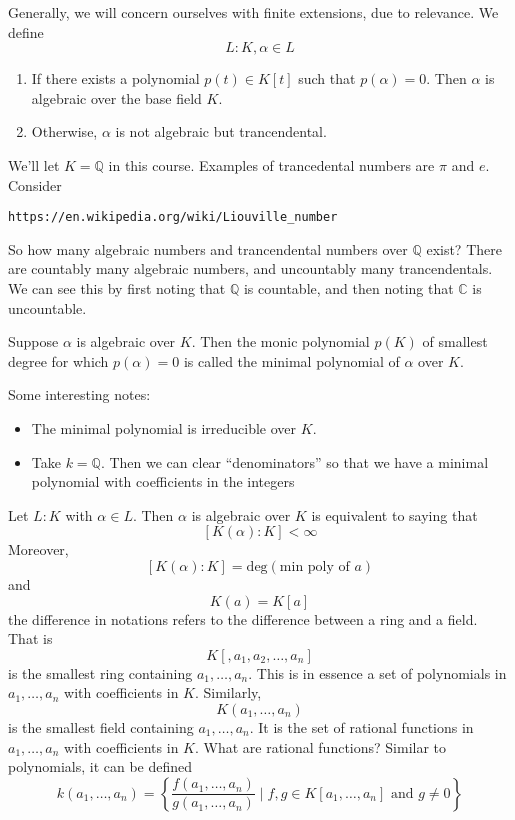 \documentclass{article}
\begin{document}
Generally, we will concern ourselves with finite extensions, due to relevance.
We define 
\[ L : K, \alpha \in L \]
\begin{enumerate}
\item If there exists a polynomial $p(t) \in K[t]$ such that $p(\alpha) = 0$.
Then $\alpha$ is algebraic over the base field $K$. 
\item Otherwise, $\alpha$ is not algebraic but trancendental.
\end{enumerate}
We'll let $K = \mathbb{Q}$ in this course. Examples of trancedental numbers are
$\pi$ and $e$. Consider
\begin{verbatim}https://en.wikipedia.org/wiki/Liouville_number\end{verbatim}
So how many algebraic numbers and trancendental numbers over $\mathbb{Q}$ exist?
There are countably many algebraic numbers, and uncountably many trancendentals.
We can see this by first noting that $\mathbb{Q}$ is countable, and then noting
that $\mathbb{C}$ is uncountable. 

Suppose $\alpha$ is algebraic over $K$. Then the monic polynomial $p(K)$ of smallest
degree for which $p(\alpha) = 0$ is called the minimal polynomial of $\alpha$
over $K$. 

Some interesting notes:
\begin{itemize}
\item The minimal polynomial is irreducible over $K$. 
\item Take $k = \mathbb{Q}$. Then we can clear ``denominators'' so that we have
a minimal polynomial with coefficients in the integers
\end{itemize}

Let $L:K$ with $\alpha \in L$. Then $\alpha$ is algebraic over $K$ is equivalent
to saying that
\[ [ K(\alpha) : K ] < \infty \]
Moreover,
\[ [ K(\alpha) : K ] = \text{deg}(\text{min poly of }a) \]
and 
\[ K(a) = K[a] \]
the difference in notations refers to the difference between a ring and a field.
That is
\[ K[,a_1, a_2, \ldots, a_n] \]
is the smallest ring containing $a_1,\ldots,a_n$. This is in essence a set of
polynomials in $a_1, \ldots, a_n$ with coefficients in $K$. Similarly, 
\[ K(a_1, \ldots, a_n) \]
is the smallest field containing $a_1,\ldots,a_n$. It is the set of rational
functions in $a_1, \ldots, a_n$ with coefficients in $K$. What are rational
functions? Similar to polynomials, it can be defined
\[ k(a_1,\ldots,a_n) = \left\{\frac{f(a_1, \ldots, a_n)}{g(a_1, \ldots,
a_n)} \mid f,g \in K[a_1,\ldots,a_n] \text{ and } g \neq 0 \right\} \]
\end{document}
